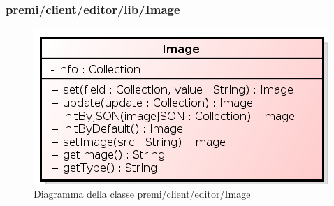 \subsubsection{premi/client/editor/lib/Image}
\begin{figure}[h]
\begin{center}
\includegraphics[scale=0.40]{img/diacla/Image.png}
\caption{Diagramma della classe premi/client/editor/Image}
\end{center}
\end{figure}


